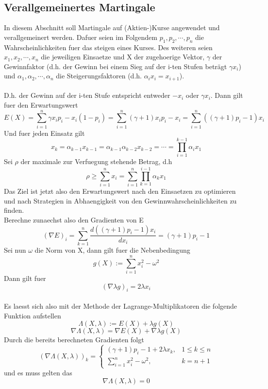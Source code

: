 \documentclass[11pt]{scrartcl}
\begin{document}
		\subsection{Verallgemeinertes Martingale}
			In diesem Abschnitt soll Martingale auf (Aktien-)Kurse angewendet und verallgemeinert werden. Dafuer seien im Folgendem \(p_{1}, p_{2}, \cdots,p_{n}\) die Wahrscheinlichkeiten fuer das steigen eines Kurses. Des weiteren seien \(x_{1}, x_{2}, \cdots,x_{n}\) die jeweiligen Einsaetze und X der zugehoerige Vektor, \(\gamma\) der Gewinnfaktor (d.h. der Gewinn bei einem Sieg auf der i-ten Stufen beträgt \(\gamma x_{i}\)) und \(\alpha_{1}, \alpha_{2}, \cdots,\alpha_{n}\) die Steigerungsfaktoren (d.h. \(\alpha_{i}x_{i}=x_{i+1}\)).\\\\
			D.h. der Gewinn auf der i-ten Stufe entspricht entweder \(-x_{i}\) oder \(\gamma x_{i}\). Dann gilt fuer den Erwartungswert
			$$
				E(X)=\sum_{i=1}^n \gamma x_{i}p_{i}-x_{i}(1-p_{i})
				=\sum_{i=1}^n (\gamma+1) x_{i}p_{i}-x_{i}
				=\sum_{i=1}^n ((\gamma +1)p_{i}-1)x_{i}
			$$
			Und fuer jeden Einsatz gilt
			$$
				x_{k}=\alpha_{k-1}x_{k-1}=\alpha_{k-1}\alpha_{k-2}x_{k-2}=\cdots=\prod_{i=1}^{k-1}\alpha_{i}x_{1}
			$$
			Sei \(\rho\) der maximale zur Verfuegung stehende Betrag, d.h
			$$
				\rho \geq \sum_{i=1}^{n}x_{i}=\sum_{i=1}^{n}\prod_{k=1}^{i-1}\alpha_{k}x_{1}
			$$
			Das Ziel ist jetzt also den Erwartungswert nach den Einsaetzen zu optimieren und nach Strategien in Abhaengigkeit von den Gewinnwahrscheinlichkeiten zu finden.\\
			Berechne zunaechst also den Gradienten von E
			$$
				(\nabla E)_{i}=\sum_{k=1}^{n}\frac{d((\gamma +1)p_{i}-1)x_{i}}{dx_{i}}=(\gamma +1)p_{i}-1
			$$
			Sei nun \(\omega\) die Norm von X, dann gilt fuer die Nebenbedingung
			\[g(X):=\sum_{i=1}^{n}x_{i}^2-{\omega}^2\]
			Dann gilt fuer \[(\nabla \lambda g)_{i} = 2\lambda x_{i}\]\\
			Es laesst sich also mit der Methode der Lagrange-Multiplikatoren die folgende Funktion aufstellen \[\Lambda(X,\lambda) := E(X)+\lambda g(X)\]
			\[\nabla \Lambda(X,\lambda) = \nabla E(X) + \nabla \lambda g(X)\]
			Durch die bereits berechneten Gradienten folgt
			\[(\nabla \Lambda (X,\lambda))_{k}=
				\begin{cases}
					(\gamma +1)p_{i}-1+2\lambda x_{k}, & 1\leq k\leq n\\
					\sum_{i=1}^{n}x_{i}^2-\omega^2, & k = n+1
				\end{cases}\]
			und es muss gelten das
			\[\nabla \Lambda(X,\lambda)=0\]
\end{document}
